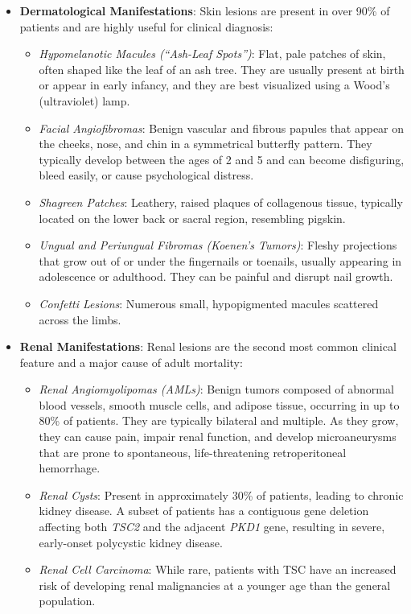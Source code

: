 \begin{itemize}
    \item \textbf{Dermatological Manifestations}: Skin lesions are present in over 90\% of patients and are highly useful for clinical diagnosis:
    \begin{itemize}
        \item \textit{Hypomelanotic Macules (``Ash-Leaf Spots'')}: Flat, pale patches of skin, often shaped like the leaf of an ash tree. They are usually present at birth or appear in early infancy, and they are best visualized using a Wood's (ultraviolet) lamp.
        \item \textit{Facial Angiofibromas}: Benign vascular and fibrous papules that appear on the cheeks, nose, and chin in a symmetrical butterfly pattern. They typically develop between the ages of 2 and 5 and can become disfiguring, bleed easily, or cause psychological distress.
        \item \textit{Shagreen Patches}: Leathery, raised plaques of collagenous tissue, typically located on the lower back or sacral region, resembling pigskin.
        \item \textit{Ungual and Periungual Fibromas (Koenen's Tumors)}: Fleshy projections that grow out of or under the fingernails or toenails, usually appearing in adolescence or adulthood. They can be painful and disrupt nail growth.
        \item \textit{Confetti Lesions}: Numerous small, hypopigmented macules scattered across the limbs.
    \end{itemize}
    \item \textbf{Renal Manifestations}: Renal lesions are the second most common clinical feature and a major cause of adult mortality:
    \begin{itemize}
        \item \textit{Renal Angiomyolipomas (AMLs)}: Benign tumors composed of abnormal blood vessels, smooth muscle cells, and adipose tissue, occurring in up to 80\% of patients. They are typically bilateral and multiple. As they grow, they can cause pain, impair renal function, and develop microaneurysms that are prone to spontaneous, life-threatening retroperitoneal hemorrhage.
        \item \textit{Renal Cysts}: Present in approximately 30\% of patients, leading to chronic kidney disease. A subset of patients has a contiguous gene deletion affecting both \textit{TSC2} and the adjacent \textit{PKD1} gene, resulting in severe, early-onset polycystic kidney disease.
        \item \textit{Renal Cell Carcinoma}: While rare, patients with TSC have an increased risk of developing renal malignancies at a younger age than the general population.

\end{itemize}
\end{itemize}
